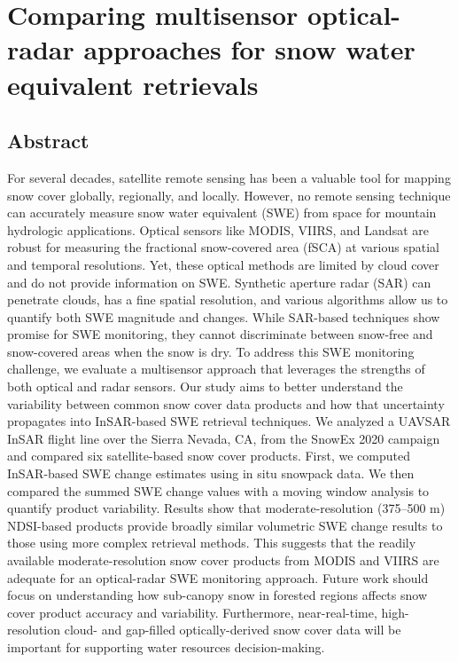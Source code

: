\hypertarget{ch4}{%
\chapter{Comparing multisensor optical-radar approaches for snow water equivalent retrievals}\label{ch4}}


\hypertarget{ch4-abstract}{\section{Abstract}\label{ch4-abstract}}
For several decades, satellite remote sensing has been a valuable tool for mapping snow cover globally, regionally, and locally. However, no remote sensing technique can accurately measure snow water equivalent (SWE) from space for mountain hydrologic applications. Optical sensors like MODIS, VIIRS, and Landsat are robust for measuring the fractional snow-covered area (fSCA) at various spatial and temporal resolutions. Yet, these optical methods are limited by cloud cover and do not provide information on SWE. Synthetic aperture radar (SAR) can penetrate clouds, has a fine spatial resolution, and various algorithms allow us to quantify both SWE magnitude and changes. While SAR-based techniques show promise for SWE monitoring, they cannot discriminate between snow-free and snow-covered areas when the snow is dry. To address this SWE monitoring challenge, we evaluate a multisensor approach that leverages the strengths of both optical and radar sensors. Our study aims to better understand the variability between common snow cover data products and how that uncertainty propagates into InSAR-based SWE retrieval techniques. We analyzed a UAVSAR InSAR flight line over the Sierra Nevada, CA, from the SnowEx 2020 campaign and compared six satellite-based snow cover products. First, we computed InSAR-based SWE change estimates using in situ snowpack data. We then compared the summed SWE change values with a moving window analysis to quantify product variability. Results show that moderate-resolution (375–500 m) NDSI-based products provide broadly similar volumetric SWE change results to those using more complex retrieval methods. This suggests that the readily available moderate-resolution snow cover products from MODIS and VIIRS are adequate for an optical-radar SWE monitoring approach. Future work should focus on understanding how sub-canopy snow in forested regions affects snow cover product accuracy and variability. Furthermore, near-real-time, high-resolution cloud- and gap-filled optically-derived snow cover data will be important for supporting water resources decision-making.
